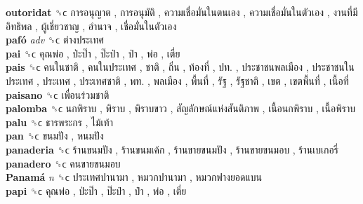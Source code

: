 \textbf{outoridat} ␝ϲ   การอนุญาต ,  การอนุมัติ ,  ความเชื่อมั่นในตนเอง ,  ความเชื่อมั่นในตัวเอง ,  งานที่มีอิทธิพล ,  ผู้เชี่ยวชาญ ,  อำนาจ ,  เชื่อมั่นในตัวเอง   \\
\textbf{pafó} \emph{adv}  ␝ϲ   ต่างประเทศ   \\
\textbf{pai} ␝ϲ   คุณพ่อ ,  ป่ะป๊า ,  ป๊ะป๋า ,  ป๋า ,  พ่อ ,  เตี่ย   \\
\textbf{pais} ␝ϲ   คนในชาติ ,  คนในประเทศ ,  ชาติ ,  ถิ่น ,  ท้องที่ ,  ปท. ,  ประชาชนพลเมือง ,  ประชาชนในประเทศ ,  ประเทศ ,  ประเทศชาติ ,  พท. ,  พลเมือง ,  พื้นที่ ,  รัฐ ,  รัฐชาติ ,  เขต ,  เขตพื้นที่ ,  เนื้อที่   \\
\textbf{paisano} ␝ϲ   เพื่อนร่วมชาติ   \\
\textbf{palomba} ␝ϲ   นกพิราบ ,  พิราบ ,  พิราบขาว ,  สัญลักษณ์แห่งสันติภาพ ,  เนื้อนกพิราบ ,  เนื้อพิราบ   \\
\textbf{palu} ␝ϲ   ธารพระกร ,  ไม้เท้า   \\
\textbf{pan} ␝ϲ   ขนมปัง ,  หนมปัง   \\
\textbf{panaderia} ␝ϲ   ร้านขนมปัง ,  ร้านขนมเค้ก ,  ร้านขายขนมปัง ,  ร้านขายขนมอบ ,  ร้านเบเกอรี่   \\
\textbf{panadero} ␝ϲ   คนขายขนมอบ   \\
\textbf{Panamá} \emph{n}  ␝ϲ   ประเทศปานามา ,  หมวกปานามา ,  หมวกฟางยอดแบน   \\
\textbf{papi} ␝ϲ   คุณพ่อ ,  ป่ะป๊า ,  ป๊ะป๋า ,  ป๋า ,  พ่อ ,  เตี่ย   \\

